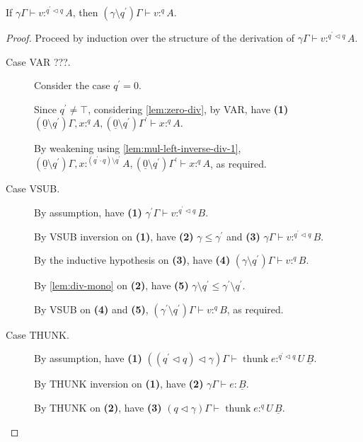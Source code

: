 \documentclass[acmsmall,screen,nonacm]{acmart}
\DeclareMathOperator{\thunk}{\text{thunk}}
\newcommand{\tee}{\vdash}
\DeclareMathOperator{\scale}{\mathbin{\triangleleft}}
\begin{document}
\begin{lemma}
\label{lem:new-modal-div-both-sides}
  If $\gamma\Gamma \tee v :^{q^\prime \scale q} A$, then $(\gamma \setminus q^\prime)\Gamma \tee v :^q A$.
\end{lemma}

\begin{proof}
  Proceed by induction over the structure of the derivation of $\gamma\Gamma \tee v :^{q^\prime \scale q} A$.
  \begin{description}
    \item[Case VAR ???.]
    Consider the case $q^\prime = 0$.

    
    
    Since $q^\prime \ne \top$, considering \ref{lem:zero-div}, by VAR, have \textbf{(1)} $(\underline{0} \setminus q^\prime)\Gamma, x :^q A, (\underline{0} \setminus q^\prime)\Gamma^\prime \tee x :^q A$.

    By weakening using \ref{lem:mul-left-inverse-div-1}, $(\underline{0} \setminus q^\prime)\Gamma, x :^{(q^\prime \cdot q) \setminus q^\prime} A, (\underline{0} \setminus q^\prime)\Gamma^\prime \tee x :^q A$, as required.
    \\
    \item[Case VSUB.]
    By assumption, have \textbf{(1)} $\gamma^\prime\Gamma \tee v :^{q^\prime \scale q} B$. 

    By VSUB inversion on \textbf{(1)}, have \textbf{(2)} $\gamma \le \gamma^\prime$ and \textbf{(3)} $\gamma\Gamma \tee v :^{q^\prime \scale q} B$.

    By the inductive hypothesis on \textbf{(3)}, have \textbf{(4)} $(\gamma \setminus q^\prime)\Gamma \tee v :^q B$.

    By \ref{lem:div-mono} on \textbf{(2)}, have \textbf{(5)} $\gamma \setminus q^\prime \le \gamma^\prime \setminus q^\prime$.

    By VSUB on \textbf{(4)} and \textbf{(5)}, $(\gamma^\prime \setminus q^\prime)\Gamma \tee v :^q B$, as required.
    \\
    \item[Case THUNK.] 
    By assumption, have \textbf{(1)} $((q^\prime \scale q) \scale \gamma)\Gamma \tee \thunk e :^{q^\prime \scale q} U \, \underline{B}$.

    By THUNK inversion on \textbf{(1)}, have \textbf{(2)} $\gamma\Gamma \tee e : \underline{B}$.

    By THUNK on \textbf{(2)}, have \textbf{(3)} $(q \scale \gamma)\Gamma \tee \thunk e :^q U \, \underline{B}$.


\end{description}
\end{proof}
\end{document}
